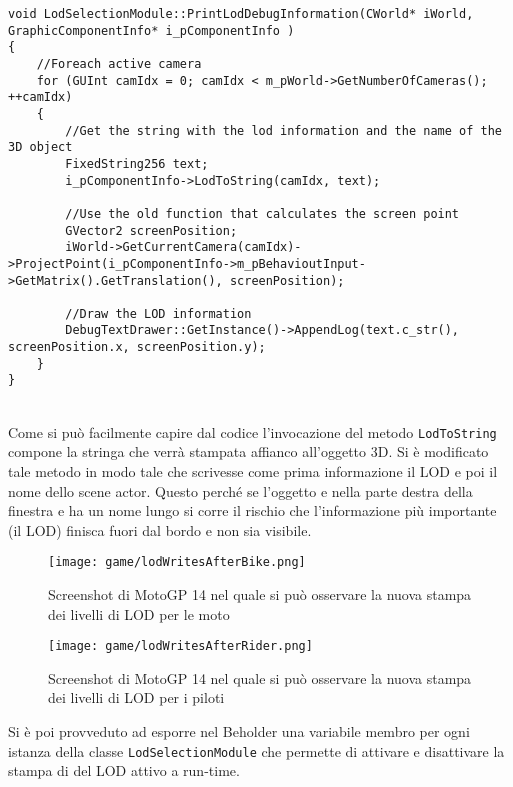 \begin{lstlisting}[style=maurizio-code, caption=Metodo per la stampa del LOD corrente, label={code:printloddebuginformation}]
void LodSelectionModule::PrintLodDebugInformation(CWorld* iWorld, GraphicComponentInfo* i_pComponentInfo )
{
	//Foreach active camera
	for (GUInt camIdx = 0; camIdx < m_pWorld->GetNumberOfCameras(); ++camIdx)
	{
		//Get the string with the lod information and the name of the 3D object
		FixedString256 text;
		i_pComponentInfo->LodToString(camIdx, text);
		
		//Use the old function that calculates the screen point
		GVector2 screenPosition;
		iWorld->GetCurrentCamera(camIdx)->ProjectPoint(i_pComponentInfo->m_pBehavioutInput->GetMatrix().GetTranslation(), screenPosition);
		
		//Draw the LOD information
		DebugTextDrawer::GetInstance()->AppendLog(text.c_str(), screenPosition.x, screenPosition.y);
	}
}
\end{lstlisting}
~\\
Come si può facilmente capire dal codice l'invocazione del metodo \texttt{LodToString} compone la stringa che verrà stampata affianco all'oggetto 3D. Si è modificato tale metodo in modo tale che scrivesse come prima informazione il LOD e poi il nome dello scene actor. Questo perché se l'oggetto e nella parte destra della finestra e ha un nome lungo si corre il rischio che l'informazione più importante (il LOD) finisca fuori dal bordo e non sia visibile.

\begin{figure}[h!] 
	\centering 
	\hspace*{-0.05\columnwidth}\texttt{[image: game/lodWritesAfterBike.png]} 
	\caption{Screenshot di MotoGP 14 nel quale si può osservare la nuova stampa dei livelli di LOD per le moto}
\end{figure}

\begin{figure}[h!] 
	\centering 
	\hspace*{-0.05\columnwidth}\texttt{[image: game/lodWritesAfterRider.png]} 
	\caption{Screenshot di MotoGP 14 nel quale si può osservare la nuova stampa dei livelli di LOD per i piloti}
\end{figure}

Si è poi provveduto ad esporre nel Beholder una variabile membro per ogni istanza della classe \texttt{LodSelectionModule} che permette di attivare e disattivare la stampa di del LOD attivo a run-time.\\

